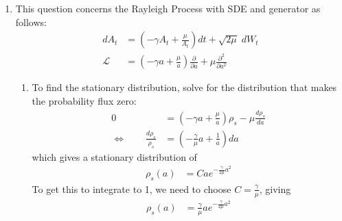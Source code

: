 \documentclass[12pt]{article}
\theoremstyle{plain}
\theoremstyle{definition}
\theoremstyle{remark}
\begin{document}
\begin{enumerate}
  \item %
    This question concerns the Rayleigh Process with SDE and generator
    as follows:
    \begin{align*}
      dA_t &= \left(-\gamma A_t + \frac{\mu}{A_t}\right) dt + \sqrt{2\mu} \; dW_t \\
      \mathscr{L} &= \left(-\gamma a + \frac{\mu}{a}\right) \frac{\partial}{\partial a}
        + \mu \frac{\partial^2}{\partial a^2}
    \end{align*}
    \begin{enumerate}
      \item %
        To find the stationary distribution, solve for the distribution
        that makes the probability flux zero:
        \begin{align*}
          0 &=
          \left(-\gamma a + \frac{\mu}{a}\right)\rho_s
          - \mu \frac{d \rho_s}{d a}
          \\
          \Leftrightarrow \qquad
          \frac{d \rho_s}{\rho_s}
          &=
          \left(-\frac{\gamma}{\mu} a + \frac{1}{a}\right)da
        \end{align*}
        which gives a stationary distribution of
        \begin{align*}
          \rho_s(a) &= C a e^{-\frac{\gamma}{2\mu}a^2}
        \end{align*}
        To get this to integrate to 1, we need to choose $C =
        \frac{\gamma}{\mu}$, giving
        \begin{align*}
          \rho_s(a) &= \frac{\gamma}{\mu} a e^{-\frac{\gamma}{2\mu}a^2}
        \end{align*}


\end{enumerate}
\end{enumerate}
\end{document}
